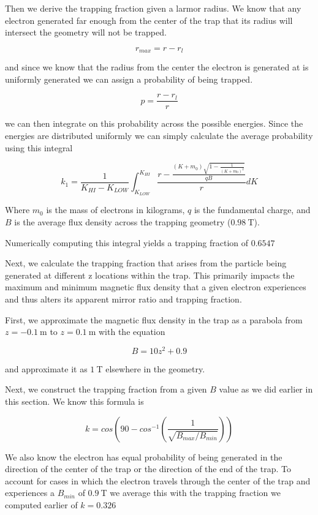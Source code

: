 \documentclass[12pt,letterpaper]{article}
\begin{document}
Then we derive the trapping fraction given a larmor radius. We know that any electron generated far enough from the center of the trap that its radius will intersect the geometry will not be trapped.

\[ r_{max} = r - r_l \]

and since we know that the radius from the center the electron is generated at is uniformly generated we can assign a probability of being trapped. 

\[ p = \frac{r - r_l}{r} \]

we can then integrate on this probability across the possible energies. Since the energies are distributed uniformly we can simply calculate the average probability using this integral

\[ k_1 = \frac{1}{K_{HI} - K_{LOW}}\int_{K_{LOW}}^{K_{HI}} \frac{r - \frac{(K + m_0)\sqrt{1 - \frac{1}{(K + m_0)^2}}}{qB}}{r} dK \]

Where $m_0$ is the mass of electrons in kilograms, $q$ is the fundamental charge, and $B$ is the average flux density across the trapping geometry ($0.98~$T). 

Numerically computing this integral yields a trapping fraction of $0.6547$

Next, we calculate the trapping fraction that arises from the particle being generated at different z locations within the trap. This primarily impacts the maximum and minimum magnetic flux density that a given electron experiences and thus alters its apparent mirror ratio and trapping fraction. 

First, we approximate the magnetic flux density in the trap as a parabola from $z=-0.1~$m to $z=0.1~$m with the equation

\[ B = 10z^2 + 0.9 \]

and approximate it as $1~$T elsewhere in the geometry.

Next, we construct the trapping fraction from a given $B$ value as we did earlier in this section. We know this formula is

\[k = cos\left( 90 - cos^{-1}\left( \frac{1}{\sqrt{B_{max}/B_{min}}} \right) \right)\]

We also know the electron has equal probability of being generated in the direction of the center of the trap or the direction of the end of the trap. To account for cases in which the electron travels through the center of the trap and experiences a $B_{min}$ of $0.9~$T we average this with the trapping fraction we computed earlier of $k = 0.326$
\end{document}
